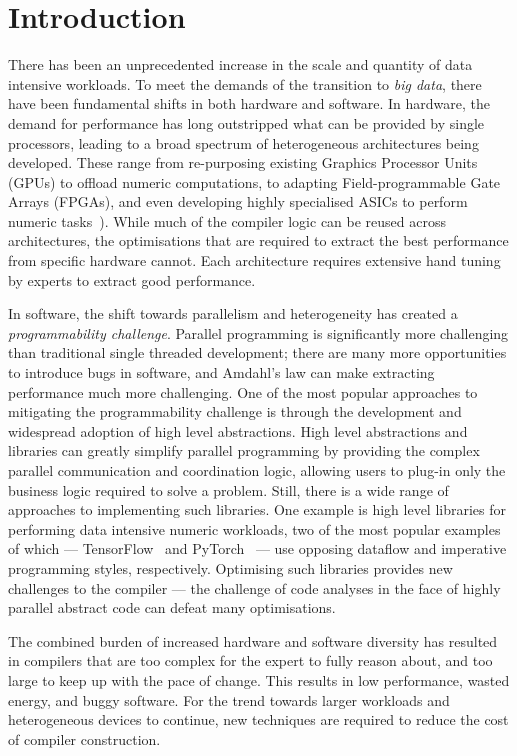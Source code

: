 \chapter{Introduction}

There has been an unprecedented increase in the scale and quantity of data intensive workloads. To meet the demands of the transition to \emph{big data}, there have been fundamental shifts in both hardware and software. In hardware, the demand for performance has long outstripped what can be provided by single processors, leading to a broad spectrum of heterogeneous architectures being developed. These range from re-purposing existing Graphics Processor Units (GPUs) to offload numeric computations, to adapting Field-programmable Gate Arrays (FPGAs), and even developing highly specialised ASICs to perform numeric tasks~\cite{Misra2010,Jouppi2017}). While much of the compiler logic can be reused across architectures, the optimisations that are required to extract the best performance from specific hardware cannot. Each architecture requires extensive hand tuning by experts to extract good performance.

In software, the shift towards parallelism and heterogeneity has created a \emph{programmability challenge}. Parallel programming is significantly more challenging than traditional single threaded development; there are many more opportunities to introduce bugs in software, and Amdahl's law can make extracting performance much more challenging. One of the most popular approaches to mitigating the programmability challenge is through the development and widespread adoption of high level abstractions. High level abstractions and libraries can greatly simplify parallel programming by providing the complex parallel communication and coordination logic, allowing users to plug-in only the business logic required to solve a problem. Still, there is a wide range of approaches to implementing such libraries. One example is high level libraries for performing data intensive numeric workloads, two of the most popular examples of which --- TensorFlow~\cite{Abadi} and PyTorch~\cite{Paszke2017} --- use opposing dataflow and imperative programming styles, respectively. Optimising such libraries provides new challenges to the compiler --- the challenge of code analyses in the face of highly parallel abstract code can defeat many optimisations.

The combined burden of increased hardware and software diversity has resulted in compilers that are too complex for the expert to fully reason about, and too large to keep up with the pace of change. This results in low performance, wasted energy, and buggy software. For the trend towards larger workloads and heterogeneous devices to continue, new techniques are required to reduce the cost of compiler construction.


